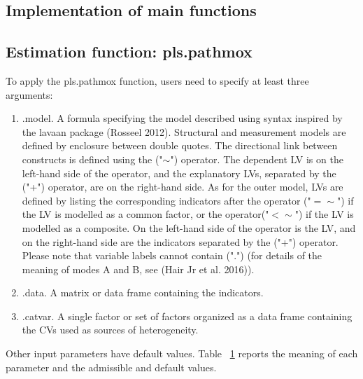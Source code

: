 \hypertarget{implementation-of-main-functions}{%
\subsection{Implementation of main functions}\label{implementation-of-main-functions}}

\hypertarget{estimation-function-pls.pathmox}{%
\subsection{Estimation function: pls.pathmox}\label{estimation-function-pls.pathmox}}

To apply the pls.pathmox function, users need to specify at least three
arguments:

\begin{enumerate}
\def\labelenumi{\arabic{enumi}.}
\item
  .model. A formula specifying the model described using syntax
  inspired by the lavaan package (Rosseel 2012). Structural and measurement
  models are defined by enclosure between double quotes. The
  directional link between constructs is defined using the
  ("\(\sim\)") operator. The dependent LV is on the left-hand side of
  the operator, and the explanatory LVs, separated by the ("+")
  operator, are on the right-hand side. As for the outer model, LVs
  are defined by listing the corresponding indicators after the
  operator ("\(=\sim\)") if the LV is modelled as a common factor, or
  the operator("\(<\sim\)") if the LV is modelled as a composite. On
  the left-hand side of the operator is the LV, and on the right-hand
  side are the indicators separated by the ("+") operator. Please
  note that variable labels cannot contain (".") (for details of the
  meaning of modes A and B, see (Hair Jr et al. 2016)).
\item
  .data. A matrix or data frame containing the indicators.
\item
  .catvar. A single factor or set of factors organized as a data frame
  containing the CVs used as sources of heterogeneity.
\end{enumerate}

Other input parameters have default values. Table
~\protect\hyperlink{par_imp}{1} reports the
meaning of each parameter and the admissible and default values.

